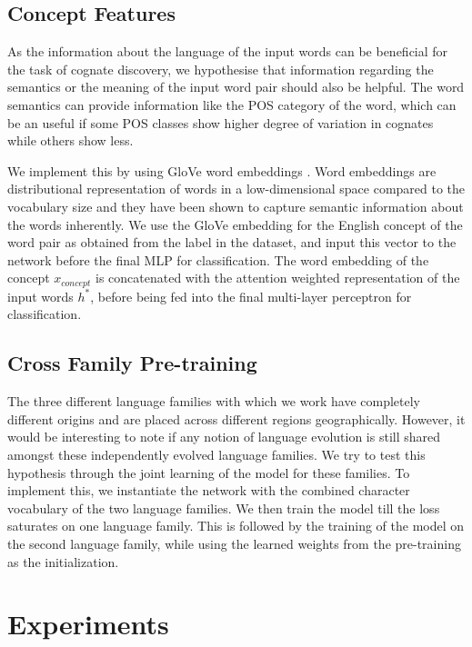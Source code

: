 \subsection{Concept Features}

As the information about the language of the input words can be beneficial for the task of cognate discovery, we hypothesise that information regarding the semantics or the meaning of the input word pair should also be helpful. The word semantics can provide information like the POS category of the word, which can be an useful if some POS classes show higher degree of variation in cognates while others show less.

We implement this by using GloVe word embeddings \citep{pennington2014glove}. Word embeddings are distributional representation of words in a low-dimensional space compared to the vocabulary size and they have been shown to capture semantic information about the words inherently. We use the GloVe embedding for the English concept of the word pair as obtained from the label in the dataset, and input this vector to the network before the final MLP for classification. The word embedding of the concept $x_{concept}$ is concatenated with the attention weighted representation of the input words $h^{*}$, before being fed into the final multi-layer perceptron for classification.

\subsection{Cross Family Pre-training}

The three different language families with which we work have completely different origins and are placed across different regions geographically. However, it would be interesting to note if any notion of language evolution is still shared amongst these independently evolved language families. We try to test this hypothesis through the joint learning of the model for these families. To implement this, we instantiate the network with the combined character vocabulary of the two language families. We then train the model till the loss saturates on one language family. This is followed by the training of the model on the second language family, while using the learned weights from the pre-training as the initialization. 


\section{Experiments}

